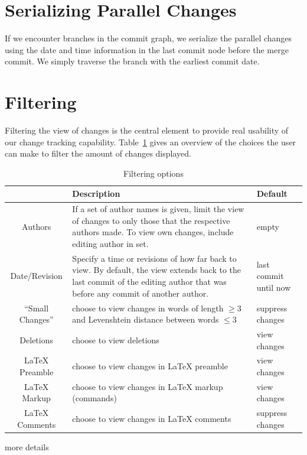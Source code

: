 \section{Serializing Parallel Changes}


If we encounter branches in the commit graph, we serialize the parallel changes using the date and time information in the last commit node before the merge commit.  We simply traverse the branch with the earliest commit date.%




\section{Filtering}

Filtering the view of changes is the central element to provide real usability of our change tracking capability.  Table~\ref{tab:filter} gives an overview of the choices the user can make to filter the amount of changes displayed.

\begin{table}
\centering
\begin{tabular}{cp{3.5in}p{1.1in}} \toprule
& Description & Default \\\midrule
Authors & If a set of author names is given, limit the view of changes to only those that the respective authors made. To view own changes, include editing author in set. & empty \\
Date/Revision & Specify a time or revisions of how far back to view.  By default, the view extends back to the last commit of the editing author that was before any commit of another author. & last commit until now\\
``Small Changes'' & choose to view changes in words of length $\geq 3$ and Levenshtein distance between words $\leq 3$ & suppress changes \\
Deletions & choose to view deletions & view changes \\
LaTeX Preamble & choose to view changes in LaTeX preamble & view changes \\
LaTeX Markup & choose to view changes in LaTeX markup (commands) & view changes \\
LaTeX Comments & choose to view changes in LaTeX comments & suppress changes \\
\bottomrule
\end{tabular}
\caption{Filtering options} \label{tab:filter}
\end{table}

more details
